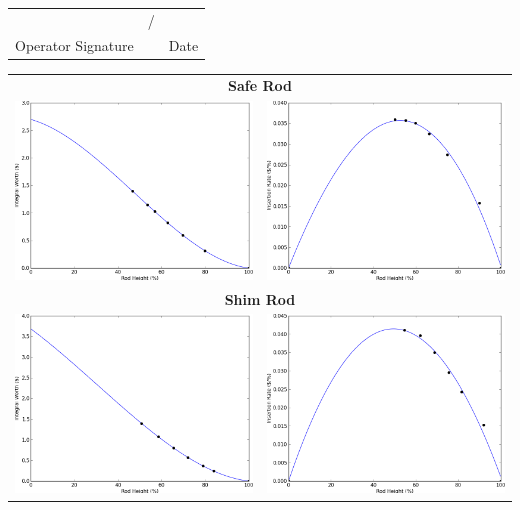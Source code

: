 \documentclass[12pt]{article}
\begin{document}
\begin{tabular}{c c c}
	\underline{\hspace{3in}} & {\Large /} & \underline{\hspace{1in}} \\
	Operator Signature & & Date
\end{tabular}

\newpage
{}
\begin{center}
    \begin{tabular}{c c}
    \multicolumn{2}{c}{\textbf{Safe Rod}} \\
    \includegraphics[width=3.2in]{safe-integral} & \includegraphics[width=3.2in]{safe-rate} \\
    \multicolumn{2}{c}{\textbf{Shim Rod}} \\
    \includegraphics[width=3.2in]{shim-integral} & \includegraphics[width=3.2in]{shim-rate} \\

\end{tabular}
\end{center}
\end{document}
